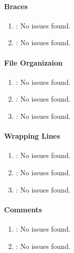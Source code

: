 \paragraph{Braces} %
\label{par:braces}

\begin{enumerate} [resume]
	\item \emph{\checkJ}: No issues found.
	\item \emph{\checkK}: No issues found.
\end{enumerate}

\paragraph{File Organizaion} %
\label{par:file_organizaion}

\begin{enumerate} [resume]
	\item \emph{\checkL}: No issues found.
	\item \emph{\checkM}: No issues found.
	\item \emph{\checkN}: No issues found.
\end{enumerate}

\paragraph{Wrapping Lines} %
\label{par:wrapping_lines}

\begin{enumerate} [resume]
	\item \emph{\checkO}: No issues found.
	\item \emph{\checkP}: No issues found.
	\item \emph{\checkQ}: No issues found.
\end{enumerate}

\paragraph{Comments} %
\label{par:comments}

\begin{enumerate} [resume]
	\item \emph{\checkR}: No issues found.
	\item \emph{\checkS}: No issues found.
\end{enumerate}


